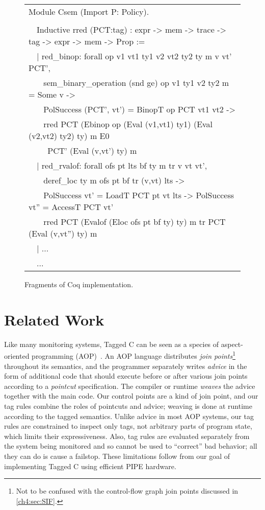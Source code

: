 \begin{figure}[t]
{    \begin{tabular}{l}
      Module Csem (Import P: Policy). \\
      \\
      \ \ Inductive rred (PCT:tag) : expr -> mem -> trace -> tag -> expr -> mem -> Prop := \\
      \ \ | red\_binop: forall op v1 vt1 ty1 v2 vt2 ty2 ty m v vt' PCT', \\
      \ \ ~ sem\_binary\_operation (snd ge) op v1 ty1 v2 ty2 m = Some v -> \\
      \ \ ~ PolSuccess (PCT', vt') = BinopT op PCT vt1 vt2 -> \\
      \ \ ~ rred PCT (Ebinop op (Eval (v1,vt1) ty1) (Eval (v2,vt2) ty2) ty) m E0 \\
      \ \ ~ ~PCT' (Eval (v,vt') ty) m \\
      \ \ | red\_rvalof: forall ofs pt lts bf ty m tr v vt vt', \\
      \ \ ~ deref\_loc ty m ofs pt bf tr (v,vt) lts -> \\
      \ \ ~ PolSuccess vt' = LoadT PCT pt vt lts -> PolSuccess vt'' = AccessT PCT vt' \\
      \ \ ~ rred PCT (Evalof (Eloc ofs pt bf ty) ty) m tr PCT (Eval (v,vt'') ty) m \\
      \ \ | ...\\
      \ \ ...
      \end{tabular} }
    
  \caption{Fragments of Coq implementation.}
  \label{ch4:fig:fullcode}
\end{figure}

\section{Related Work}
\label{ch4:sec:related}

Like many monitoring systems, Tagged C can be seen as a species of 
aspect-oriented programming (AOP)~\cite{Kiczales97:AOP}. %
An AOP language distributes {\em join points}\footnote{Not to be confused with the control-flow graph
join points discussed in \cref{ch4:sec:SIF}.} throughout its semantics, 
and the programmer separately writes {\em advice} in the form of
additional code that should execute before or after various join points according to
a {\em pointcut} specification. The compiler or runtime 
{\em weaves} the advice together with the main code.
Our control points are a kind of join point, and our tag rules combine the roles of pointcuts and advice; weaving
is done at runtime according to the tagged semantics. Unlike advice in most AOP systems, our
tag rules are constrained to inspect only tags, not arbitrary parts of program state, which limits their expressiveness. 
Also, tag rules are evaluated separately from the system being monitored and so cannot be used to ``correct'' bad
behavior; all they can do is cause a failstop.  
These limitations follow from our goal of implementing Tagged C using efficient PIPE hardware. 

